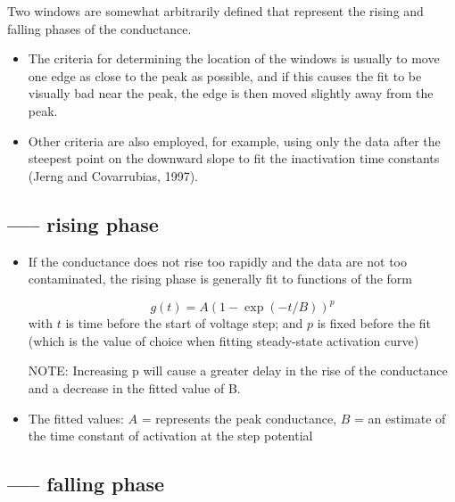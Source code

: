 Two windows are somewhat arbitrarily defined that represent the rising and
falling phases of the conductance.
\begin{itemize}

  \item  The criteria for determining the location of the windows is usually to
  move one edge as close to the peak as possible, and if this causes the fit to
  be visually bad near the peak, the edge is then moved slightly away from the
  peak.

  \item Other criteria are also employed, for example, using only the data after
  the steepest point on the downward slope to fit the inactivation time
  constants (Jerng and Covarrubias, 1997).

\end{itemize}

\subsection{----- rising phase}


\begin{itemize}

  \item If the conductance does not rise too rapidly and
the data are not too contaminated, the rising phase is generally fit to
functions of the form

\begin{equation}
g(t) = A \left( 1 - \exp( -t/B) \right)^p
\end{equation}
with $t$ is time before the start of voltage step; and $p$ is fixed before the
fit (which is the value of choice when fitting steady-state activation curve)

NOTE: Increasing p will cause a greater delay in
the rise of the conductance and a decrease in the fitted
value of B.

  \item The fitted values: $A$ = represents the peak conductance, $B$ = an
estimate of the time constant of activation at the step potential


\end{itemize}


\subsection{----- falling phase}

